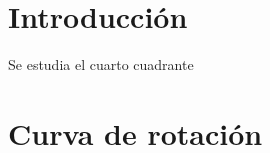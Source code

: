 \documentclass[letterpaper,oneside]{article}
\begin{document}
	
\templatePortrait

\templatePagecfg


\templateIndex

\templateFinalcfg


\section{Introducción}
Se estudia el cuarto cuadrante

\section{Curva de rotación}





\end{document}
